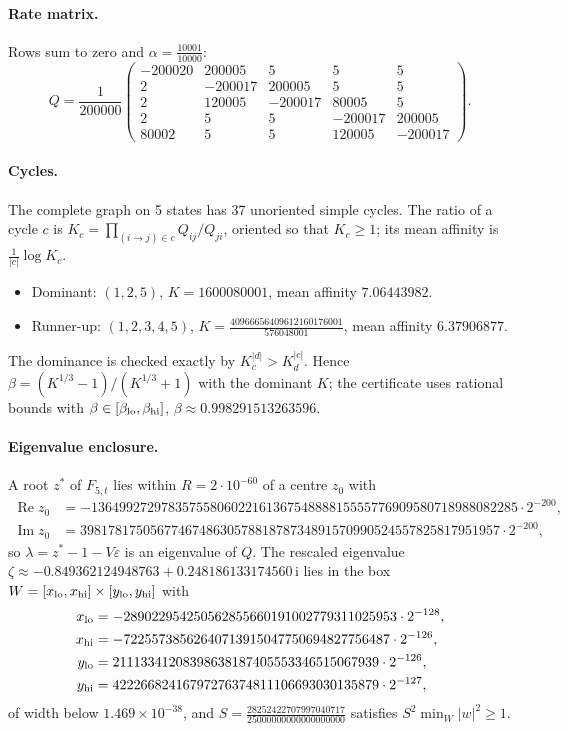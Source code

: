 \documentclass[11pt,a4paper]{article}
\numberwithin{equation}{section}
\theoremstyle{definition}
\theoremstyle{remark}
\newcommand{\ii}{\mathrm{i}}
\newcommand{\eps}{\varepsilon}
\begin{document}
\paragraph{Rate matrix.} Rows sum to zero and \(\alpha=\tfrac{10001}{10000}\):
{\small\[Q=\frac{1}{200000}\begin{pmatrix}-200020&200005&5&5&5\\
2&-200017&200005&5&5\\
2&120005&-200017&80005&5\\
2&5&5&-200017&200005\\
80002&5&5&120005&-200017\end{pmatrix}.\]}
\paragraph{Cycles.} The complete graph on 5 states has 37 unoriented simple cycles. The ratio of a cycle \(c\) is \(K_c=\prod_{(i\to j)\in c}Q_{ij}/Q_{ji}\), oriented so that \(K_c\ge1\); its mean affinity is \(\frac1{|c|}\log K_c\).
\begin{itemize}
\item Dominant: \((1,2,5)\), \(K=1600080001\), mean affinity \(7.06443982\).
\item Runner-up: \((1,2,3,4,5)\), \(K=\tfrac{40966656409612160176001}{576048001}\), mean affinity \(6.37906877\).
\end{itemize}
The dominance is checked exactly by \(K_c^{|d|}>K_d^{|c|}\). Hence \(\beta=(K^{1/3}-1)/(K^{1/3}+1)\) with the dominant \(K\); the certificate uses rational bounds with \(\beta\in[\beta_{\rm lo},\beta_{\rm hi}]\), \(\beta\approx0.998291513263596\).

\paragraph{Eigenvalue enclosure.} A root \(z^*\) of \(F_{5,t}\) lies within \(R=2\cdot10^{-60}\) of
a centre \(z_0\) with
\begin{align*}
\operatorname{Re}z_0&=-1364992729783575580602216136754888815555776909580718988082285\cdot2^{-200},\\
\operatorname{Im}z_0&=398178175056774674863057881878734891570990524557825817951957\cdot2^{-200},
\end{align*}
so \(\lambda=z^*-1-V\eps\) is an eigenvalue of \(Q\). The rescaled eigenvalue \(\zeta\approx-0.849362124948763+0.248186133174560\,\ii\) lies in the box \(W=[x_{\rm lo},x_{\rm hi}]\times[y_{\rm lo},y_{\rm hi}]\) with
\begin{align*}
x_{\rm lo}&=-289022954250562855660191002779311025953\cdot2^{-128},\\ x_{\rm hi}&=-72255738562640713915047750694827756487\cdot2^{-126},\\
y_{\rm lo}&=21113341208398638187405553346515067939\cdot2^{-126},\\ y_{\rm hi}&=42226682416797276374811106693030135879\cdot2^{-127},
\end{align*}
of width below \(1.469\times10^{-38}\), and \(S=\tfrac{28252422707997040717}{25000000000000000000}\) satisfies \(S^2\min_W|w|^2\ge1\).
\end{document}
